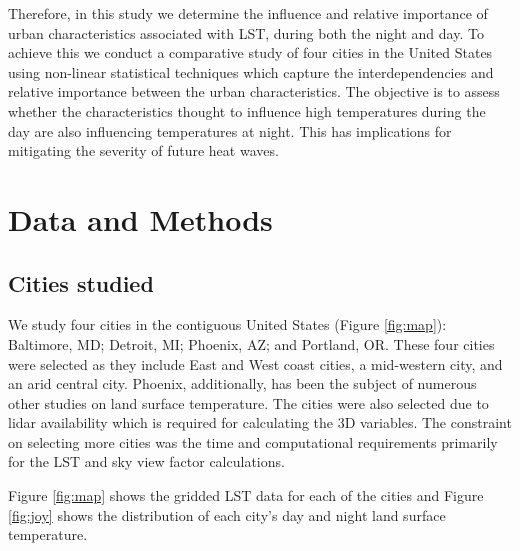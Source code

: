 \documentclass[final,3p,times,twocolumn,sort&compress]{elsarticle}
\begin{document}
Therefore, in this study we determine the influence and relative importance of urban characteristics associated with LST, during both the night and day. 
To achieve this we conduct a comparative study of four cities in the United States using non-linear statistical techniques which capture the interdependencies and relative importance between the urban characteristics.
The objective is to assess whether the characteristics thought to influence high temperatures during the day are also influencing temperatures at night.
This has implications for mitigating the severity of future heat waves.

\section{Data and Methods}
\subsection{Cities studied}

We study four cities in the contiguous United States (Figure \ref{fig:map}): Baltimore, MD; Detroit, MI; Phoenix, AZ; and Portland, OR. These four cities were selected as they include East and West coast cities, a mid-western city, and an arid central city. Phoenix, additionally, has been the subject of numerous other studies on land surface temperature. The cities were also selected due to lidar availability which is required for calculating the 3D variables. The constraint on selecting more cities was the time and computational requirements primarily for the LST and sky view factor calculations. 

Figure \ref{fig:map} shows the gridded LST data for each of the cities and Figure \ref{fig:joy} shows the distribution of each city's day and night land surface temperature. 
\end{document}
